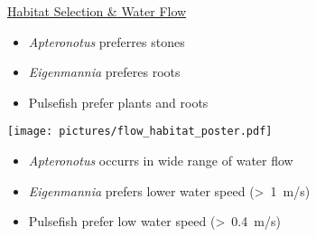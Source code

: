 \documentclass[portrait,final,paperwidth=84.1cm,paperheight=118.9cm,fontscale=0.225,margin=50pt,american]{baposter}
\begin{document}
\begin{poster}
{

%
\begin{center}
\vspace*{0.25cm}
\underline{Habitat Selection \& Water Flow}
\end{center}
%
\begin{itemize}[leftmargin=0.43cm] \itemsep0pt
\item \textit{Apteronotus} preferres stones
\item \textit{Eigenmannia} preferes roots
\item Pulsefish prefer plants and roots
\end{itemize}
%
\begin{center}
\texttt{[image: pictures/flow\_habitat\_poster.pdf]}
\end{center}
%
\begin{itemize}[leftmargin=0.43cm] \itemsep0pt
\item \textit{Apteronotus} occurrs in wide range of water flow
\item \textit{Eigenmannia} prefers lower water speed (>~1~m/s)
\item Pulsefish prefer low water speed (>~0.4~m/s)
\end{itemize}
}




\end{poster}
\end{document}
